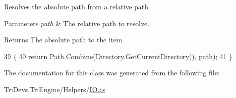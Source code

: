 Resolves the absolute path from a relative path. 


\begin{DoxyParams}{Parameters}
{\em path} & The relative path to resolve.\\
\hline
\end{DoxyParams}
\begin{DoxyReturn}{Returns}
The absolute path to the item.
\end{DoxyReturn}

\begin{DoxyCode}
39         \{
40             \textcolor{keywordflow}{return} Path.Combine(Directory.GetCurrentDirectory(), path);
41         \}
\end{DoxyCode}


The documentation for this class was generated from the following file\-:\begin{DoxyCompactItemize}
\item 
Tri\-Devs.\-Tri\-Engine/\-Helpers/\hyperlink{_i_o_8cs}{I\-O.\-cs}\end{DoxyCompactItemize}
